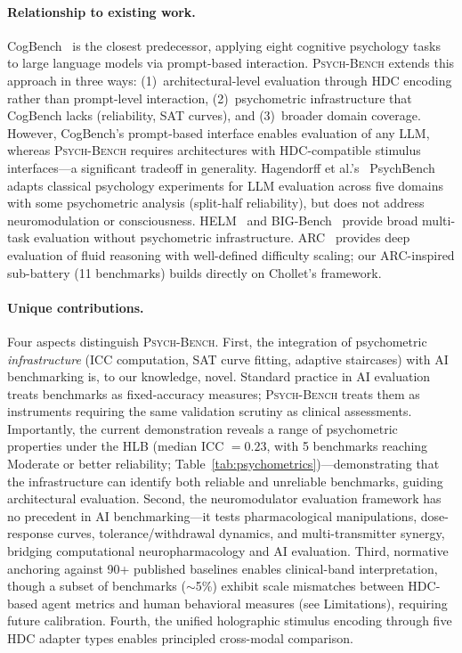 \documentclass[11pt,letterpaper]{article}
\newcommand{\psychbench}{\textsc{Psych-Bench}}
\newcommand{\hlb}{\textsc{HLB}}
\begin{document}
\paragraph{Relationship to existing work.} CogBench~\citep{codaforno2024cogbench} is the closest predecessor, applying eight cognitive psychology tasks to large language models via prompt-based interaction. \psychbench{} extends this approach in three ways: (1)~architectural-level evaluation through HDC encoding rather than prompt-level interaction, (2)~psychometric infrastructure that CogBench lacks (reliability, SAT curves), and (3)~broader domain coverage. However, CogBench's prompt-based interface enables evaluation of any LLM, whereas \psychbench{} requires architectures with HDC-compatible stimulus interfaces---a significant tradeoff in generality. Hagendorff et al.'s~\citep{hagendorff2023machine} PsychBench adapts classical psychology experiments for LLM evaluation across five domains with some psychometric analysis (split-half reliability), but does not address neuromodulation or consciousness. HELM~\citep{liang2023holistic} and BIG-Bench~\citep{srivastava2023beyond} provide broad multi-task evaluation without psychometric infrastructure. ARC~\citep{chollet2019measure} provides deep evaluation of fluid reasoning with well-defined difficulty scaling; our ARC-inspired sub-battery (11 benchmarks) builds directly on Chollet's framework.

\paragraph{Unique contributions.} Four aspects distinguish \psychbench{}. First, the integration of psychometric \emph{infrastructure} (ICC computation, SAT curve fitting, adaptive staircases) with AI benchmarking is, to our knowledge, novel. Standard practice in AI evaluation treats benchmarks as fixed-accuracy measures; \psychbench{} treats them as instruments requiring the same validation scrutiny as clinical assessments. Importantly, the current demonstration reveals a range of psychometric properties under the \hlb{} (median ICC $= 0.23$, with 5 benchmarks reaching Moderate or better reliability; Table~\ref{tab:psychometrics})---demonstrating that the infrastructure can identify both reliable and unreliable benchmarks, guiding architectural evaluation. Second, the neuromodulator evaluation framework has no precedent in AI benchmarking---it tests pharmacological manipulations, dose-response curves, tolerance/withdrawal dynamics, and multi-transmitter synergy, bridging computational neuropharmacology and AI evaluation. Third, normative anchoring against 90+ published baselines enables clinical-band interpretation, though a subset of benchmarks ($\sim$5\%) exhibit scale mismatches between HDC-based agent metrics and human behavioral measures (see Limitations), requiring future calibration. Fourth, the unified holographic stimulus encoding through five HDC adapter types enables principled cross-modal comparison.
\end{document}
